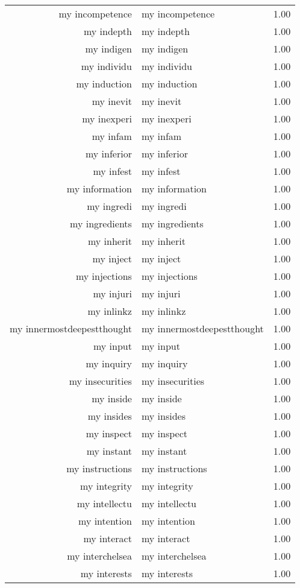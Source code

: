 \begin{table}[ht]
\begin{tabular}{rlr}
  my incompetence & my incompetence & 1.00 \\ 
  my indepth & my indepth & 1.00 \\ 
  my indigen & my indigen & 1.00 \\ 
  my individu & my individu & 1.00 \\ 
  my induction & my induction & 1.00 \\ 
  my inevit & my inevit & 1.00 \\ 
  my inexperi & my inexperi & 1.00 \\ 
  my infam & my infam & 1.00 \\ 
  my inferior & my inferior & 1.00 \\ 
  my infest & my infest & 1.00 \\ 
  my information & my information & 1.00 \\ 
  my ingredi & my ingredi & 1.00 \\ 
  my ingredients & my ingredients & 1.00 \\ 
  my inherit & my inherit & 1.00 \\ 
  my inject & my inject & 1.00 \\ 
  my injections & my injections & 1.00 \\ 
  my injuri & my injuri & 1.00 \\ 
  my inlinkz & my inlinkz & 1.00 \\ 
  my innermostdeepestthought & my innermostdeepestthought & 1.00 \\ 
  my input & my input & 1.00 \\ 
  my inquiry & my inquiry & 1.00 \\ 
  my insecurities & my insecurities & 1.00 \\ 
  my inside & my inside & 1.00 \\ 
  my insides & my insides & 1.00 \\ 
  my inspect & my inspect & 1.00 \\ 
  my instant & my instant & 1.00 \\ 
  my instructions & my instructions & 1.00 \\ 
  my integrity & my integrity & 1.00 \\ 
  my intellectu & my intellectu & 1.00 \\ 
  my intention & my intention & 1.00 \\ 
  my interact & my interact & 1.00 \\ 
  my interchelsea & my interchelsea & 1.00 \\ 
  my interests & my interests & 1.00 \\ 

\end{tabular}
\end{table}
